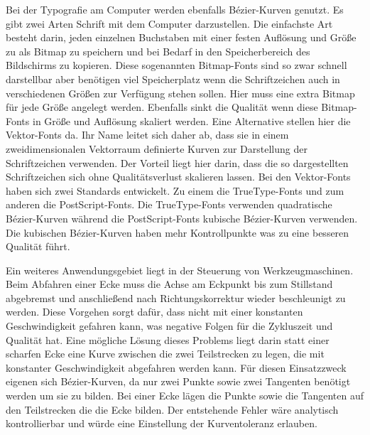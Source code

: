 Bei der Typografie am Computer werden ebenfalls Bézier-Kurven genutzt. Es gibt zwei Arten Schrift mit dem Computer darzustellen. Die einfachste Art besteht darin, jeden einzelnen Buchstaben mit einer festen Auflösung und Größe zu als Bitmap zu speichern und bei Bedarf in den Speicherbereich des Bildschirms zu kopieren. Diese sogenannten Bitmap-Fonts sind so zwar schnell darstellbar aber benötigen viel Speicherplatz wenn die Schriftzeichen auch in verschiedenen Größen zur Verfügung stehen sollen. Hier muss eine extra Bitmap für jede Größe angelegt werden.  Ebenfalls sinkt die Qualität wenn diese Bitmap-Fonts in Größe  und Auflösung skaliert werden. Eine Alternative stellen hier  die Vektor-Fonts da. Ihr Name leitet sich daher ab, dass sie  in einem zweidimensionalen Vektorraum definierte Kurven zur  Darstellung der Schriftzeichen verwenden. Der Vorteil liegt  hier darin, dass die so dargestellten Schriftzeichen sich  ohne Qualitätsverlust skalieren lassen. Bei den Vektor-Fonts  haben sich zwei Standards entwickelt. Zu einem die TrueType-Fonts und zum anderen die PostScript-Fonts.  Die TrueType-Fonts verwenden quadratische Bézier-Kurven  während die PostScript-Fonts kubische Bézier-Kurven  verwenden. Die kubischen Bézier-Kurven haben mehr  Kontrollpunkte was zu eine besseren Qualität  führt.\cite{Malaka:2009}
 
 \bigskip
 

Ein weiteres Anwendungsgebiet liegt in der Steuerung von Werkzeugmaschinen. Beim Abfahren einer Ecke muss die Achse am Eckpunkt bis zum Stillstand abgebremst und anschließend nach Richtungskorrektur wieder beschleunigt zu werden. Diese Vorgehen sorgt dafür, dass nicht mit einer konstanten Geschwindigkeit gefahren kann, was negative Folgen für die Zykluszeit und Qualität hat. Eine mögliche Lösung dieses Problems liegt darin statt einer scharfen Ecke eine Kurve zwischen die zwei Teilstrecken zu legen, die mit konstanter Geschwindigkeit abgefahren werden kann. Für diesen Einsatzzweck eigenen sich Bézier-Kurven, da nur zwei Punkte sowie zwei Tangenten benötigt werden um sie zu bilden. Bei einer Ecke lägen die Punkte sowie die Tangenten auf den Teilstrecken die die Ecke bilden. Der entstehende Fehler wäre analytisch kontrollierbar und würde eine Einstellung der Kurventoleranz erlauben.\cite{Sencer:2014}